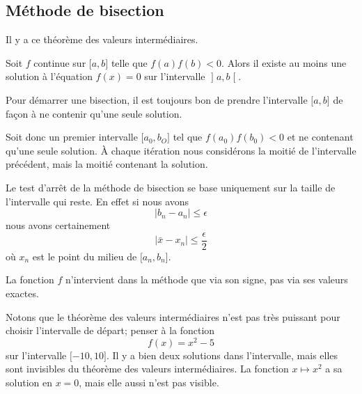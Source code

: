 \subsection{Méthode de bisection}

Il y a ce théorème des valeurs intermédiaires.
\begin{theorem}
	Soit \( f\) continue sur \( \mathopen[ a , b \mathclose]\) telle que \( f(a)f(b)<0\). Alors il existe au moins une solution à l'équation \( f(x)=0\) sur l'intervalle \( \mathopen] a , b \mathclose[\).
\end{theorem}

Pour démarrer une bisection, il est toujours bon de prendre l'intervalle \( \mathopen[ a , b \mathclose]\) de façon à ne contenir qu'une seule solution.

Soit donc un premier intervalle \( \mathopen[ a_0 , b_O \mathclose]\) tel que \( f(a_0)f(b_0)<0\) et ne contenant qu'une seule solution. À chaque itération nous considérons la moitié de l'intervalle précédent, mais la moitié contenant la solution.

Le test d'arrêt de la méthode de bisection se base uniquement sur la taille de l'intervalle qui reste. En effet si nous avons
\begin{equation}
	| b_n-a_n |\leq \epsilon
\end{equation}
nous avons certainement
\begin{equation}
	| \bar x-x_n |\leq \frac{ \epsilon }{2}
\end{equation}
où \( x_n\) est le point du milieu de \( \mathopen[ a_n , b_n \mathclose]\).

\begin{normaltext}
	La fonction \( f\) n'intervient dans la méthode que via son signe, pas via ses valeurs exactes.
\end{normaltext}

\begin{normaltext}
	Notons que le théorème des valeurs intermédiaires n'est pas très puissant pour choisir l'intervalle de départ; penser à la fonction
	\begin{equation}
		f(x)=x^2-5
	\end{equation}
	sur l'intervalle \( \mathopen[ -10 , 10 \mathclose]\). Il y a bien deux solutions dans l'intervalle, mais elles sont invisibles du théorème des valeurs intermédiaires. La fonction \( x\mapsto x^2\) a sa solution en \( x=0\), mais elle aussi n'est pas visible.
\end{normaltext}

